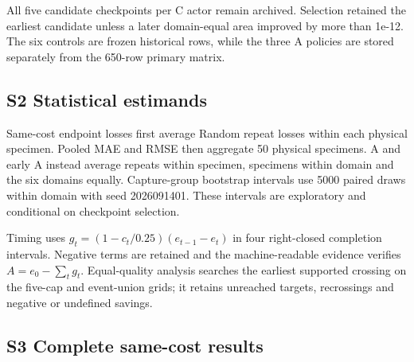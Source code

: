 \documentclass[11pt,a4paper]{article}
\begin{document}
All five candidate checkpoints per C actor remain archived. Selection retained the earliest candidate unless a later domain-equal area improved by more than 1e-12. The six controls are frozen historical rows, while the three A policies are stored separately from the 650-row primary matrix.

\hypertarget{s2-statistical-estimands}{%
\subsection{S2 Statistical estimands}\label{s2-statistical-estimands}}

Same-cost endpoint losses first average Random repeat losses within each physical specimen. Pooled MAE and RMSE then aggregate 50 physical specimens. A and early A instead average repeats within specimen, specimens within domain and the six domains equally. Capture-group bootstrap intervals use 5000 paired draws within domain with seed 2026091401. These intervals are exploratory and conditional on checkpoint selection.

Timing uses \(g_t=(1-c_t/0.25)(e_{t-1}-e_t)\) in four right-closed completion intervals. Negative terms are retained and the machine-readable evidence verifies \(A=e_0-\sum_t g_t\). Equal-quality analysis searches the earliest supported crossing on the five-cap and event-union grids; it retains unreached targets, recrossings and negative or undefined savings.

\hypertarget{s3-complete-same-cost-results}{%
\subsection{S3 Complete same-cost results}\label{s3-complete-same-cost-results}}
\end{document}
